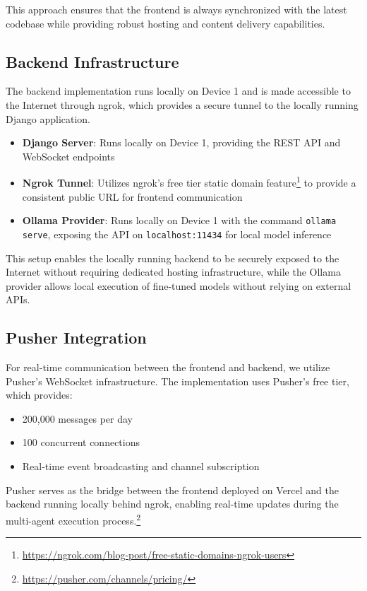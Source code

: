 This approach ensures that the frontend is always synchronized with the latest codebase while providing robust hosting and content delivery capabilities.

\subsection{Backend Infrastructure}
The backend implementation runs locally on Device 1 and is made accessible to the Internet through ngrok, which provides a secure tunnel to the locally running Django application.

\begin{itemize}
    \item \textbf{Django Server}: Runs locally on Device 1, providing the REST API and WebSocket endpoints
    \item \textbf{Ngrok Tunnel}: Utilizes ngrok's free tier static domain feature\footnote{\url{https://ngrok.com/blog-post/free-static-domains-ngrok-users}} to provide a consistent public URL for frontend communication
    \item \textbf{Ollama Provider}: Runs locally on Device 1 with the command \texttt{ollama serve}, exposing the API on \texttt{localhost:11434} for local model inference
\end{itemize}

This setup enables the locally running backend to be securely exposed to the Internet without requiring dedicated hosting infrastructure, while the Ollama provider allows local execution of fine-tuned models without relying on external APIs.

\subsection{Pusher Integration}
For real-time communication between the frontend and backend, we utilize Pusher's WebSocket infrastructure. The implementation uses Pusher's free tier, which provides:

\begin{itemize}
    \item 200,000 messages per day
    \item 100 concurrent connections
    \item Real-time event broadcasting and channel subscription
\end{itemize}

Pusher serves as the bridge between the frontend deployed on Vercel and the backend running locally behind ngrok, enabling real-time updates during the multi-agent execution process.\footnote{\url{https://pusher.com/channels/pricing/}}

